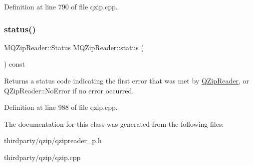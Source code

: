 Definition at line 790 of file qzip.\+cpp.

\mbox{\label{class_m_q_zip_reader_a0d69600eed44ee33e5b8e8cc90238452}} 
\subsubsection{\texorpdfstring{status()}{status()}}
{\footnotesize\ttfamily M\+Q\+Zip\+Reader\+::\+Status M\+Q\+Zip\+Reader\+::status (\begin{DoxyParamCaption}{ }\end{DoxyParamCaption}) const}

Returns a status code indicating the first error that was met by \hyperlink{class_q_zip_reader}{Q\+Zip\+Reader}, or Q\+Zip\+Reader\+::\+No\+Error if no error occurred. 

Definition at line 988 of file qzip.\+cpp.



The documentation for this class was generated from the following files\+:\begin{DoxyCompactItemize}
\item 
thirdparty/qzip/qzipreader\+\_\+p.\+h\item 
thirdparty/qzip/qzip.\+cpp\end{DoxyCompactItemize}

